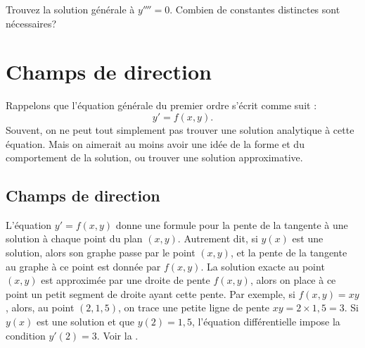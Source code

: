 \begin{exercise}
	Trouvez la solution générale à $y''''= 0$.  Combien de constantes distinctes sont nécessaires?
\end{exercise}


\sectionnewpage
\section{Champs de direction}
\label{slopefields:section}


%

Rappelons que l'équation générale du premier ordre s'écrit comme suit :
\begin{equation*}
	y' = f(x , y).
\end{equation*}
Souvent, on ne peut tout simplement pas trouver une solution analytique à cette équation.
Mais on aimerait au moins avoir une idée de la forme et du comportement de la solution, ou trouver une solution approximative.



\subsection{Champs de direction}

L'équation $y' = f(x , y)$ donne une formule pour la pente de la tangente à une solution à chaque point du plan $(x , y)$.
Autrement dit, si $y(x)$ est une solution, alors son graphe passe par le point $(x , y)$,
et la pente de la tangente au graphe à ce point est donnée par $f(x , y)$.
La solution exacte au point $(x , y)$ est approximée par une droite de pente $f(x , y)$,
alors on place à ce point un petit segment de droite ayant cette pente.
%
Par exemple, si $f(x , y) = xy$, alors, au point $(2 , 1,5)$, on trace une petite ligne de pente $xy = 2 \times 1,5 = 3$.
Si $y(x)$ est une solution et que $y(2) = 1,5$, l'équation différentielle impose la condition $y'(2) = 3$.
Voir la .

